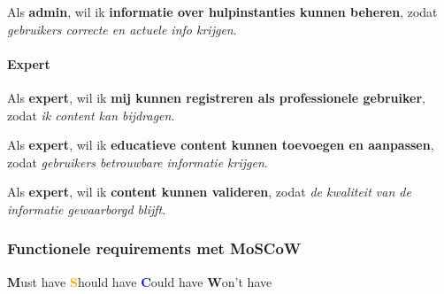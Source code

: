 \vspace{1em}

Als \textbf{admin}, \newline
wil ik \textbf{informatie over hulpinstanties kunnen beheren}, \newline
zodat \textit{gebruikers correcte en actuele info krijgen}.

\vspace{1em}

\paragraph{Expert}

\vspace{1em}

Als \textbf{expert}, \newline
wil ik \textbf{mij kunnen registreren als professionele gebruiker}, \newline
zodat \textit{ik content kan bijdragen}.

\vspace{1em}

Als \textbf{expert}, \newline
wil ik \textbf{educatieve content kunnen toevoegen en aanpassen}, \newline
zodat \textit{gebruikers betrouwbare informatie krijgen}.

\vspace{1em}

Als \textbf{expert}, \newline
wil ik \textbf{content kunnen valideren}, \newline
zodat \textit{de kwaliteit van de informatie gewaarborgd blijft}.

\vspace{1em}
\vspace{1em}
\vspace{1em}

\subsubsection{Functionele requirements met MoSCoW}
\label{subsubsec:frs-moscow}

\vspace{2em}

{\small
    \textcolor{green!80!black}{\textbf{M}}ust have \quad
    \textcolor{orange}{\textbf{S}}hould have \quad
    \textcolor{blue}{\textbf{C}}ould have \quad
    \textcolor{black!60}{\textbf{W}}on’t have
}

